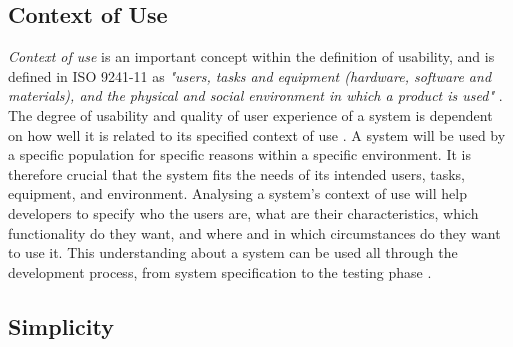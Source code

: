 \subsection{Context of Use}
\label{subsec:contextofuse}
\emph{Context of use} is an important concept within the definition of usability, and is defined in ISO 9241-11 as \emph{"users, tasks and equipment (hardware, software and materials), and the physical and social environment in which a product is used"} \cite{maguire2001context}.  The degree of usability and quality of user experience of a system is dependent on how well it is related to its specified context of use \cite{bevan1995human}. A system will be used by a specific population for specific reasons within a specific environment. It is therefore crucial that the system fits the needs of its intended users, tasks, equipment, and environment. Analysing a system's context of use will help developers to specify who the users are, what are their characteristics, which functionality do they want, and where and in which circumstances do they want to use it. This understanding about a system can be used all through the development process, from system specification to the testing phase \cite{maguire2001context}.

\subsection{Simplicity}
\label{sec:simplicity}

